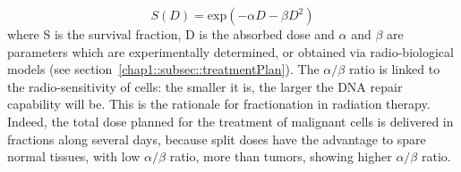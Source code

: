 \begin{equation}
S(D) = \mathrm{exp}(-\alpha D - \beta D^{2})
\label{chap1::eq::survivalPar}
\end{equation}
where S is the survival fraction, D is the absorbed dose and $\alpha$ and $\beta$ are parameters which are experimentally determined, or obtained via radio-biological models (see section~\ref{chap1::subsec::treatmentPlan}). The $\alpha/\beta$ ratio is linked to the radio-sensitivity of cells: the smaller it is, the larger the DNA repair capability will be. This is the rationale for fractionation in radiation therapy. Indeed, the total dose planned for the treatment of malignant cells is delivered in fractions along several days, because split doses have the advantage to spare normal tissues, with low $\alpha/\beta$ ratio, more than tumors, showing higher $\alpha/\beta$ ratio. 


